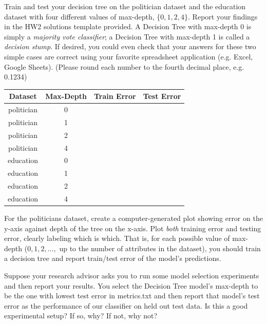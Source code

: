  \begin{questions}
    \question[2] Train and test your decision tree on the politician dataset and the education dataset with four different values of max-depth, $\{0,1,2,4\}$. Report your findings in the HW2 solutions template provided. A Decision Tree with max-depth 0 is simply a \emph{majority vote classifier}; a Decision Tree with max-depth 1 is called a \emph{decision stump}. If desired, you could even check that your answers for these two simple cases are correct using your favorite spreadsheet application (e.g. Excel, Google Sheets). (Please round each number to the fourth decimal place, e.g. 0.1234)
    
    \begin{center}
    \begin{tabular}{cc|c|c}
        \toprule
      {\bf Dataset}   & {\bf Max-Depth} & {\bf Train Error} & {\bf Test Error} \\
      \midrule
        politician & 0 & & \\
        politician & 1 & & \\
        politician & 2 & & \\
        politician & 4 & & \\
        \midrule
        education & 0 & & \\
        education & 1 & & \\
        education & 2 & & \\
        education & 4 & & \\
        \bottomrule
    \end{tabular}
    \end{center}
    
    
    \question[3] For the politicians dataset, create a computer-generated plot showing error on the y-axis against depth of the tree on the x-axis. Plot \emph{both} training error and testing error, clearly labeling which is which.  That is, for each possible value of max-depth ($0, 1, 2, \ldots,$ up to the number of attributes in the dataset), you should train a decision tree and report train/test error of the model's predictions.
    
    \begin{tcolorbox}[fit,height=10cm, width=15cm, blank, borderline={1pt}{-2pt},nobeforeafter]
    \end{tcolorbox}
    

\clearpage
    \question[2] Suppose your research advisor asks you to run some model selection experiments and then report your results. You select the Decision Tree model's max-depth to be the one with lowest test error in metrics.txt and then report that model's test error as the performance of our classifier on held out test data. Is this a good experimental setup? If so, why? If not, why not?
    

\end{questions}
